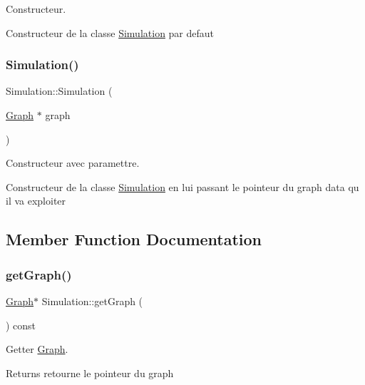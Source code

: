 Constructeur. 

Constructeur de la classe \mbox{\hyperlink{class_simulation}{Simulation}} par defaut \mbox{\label{class_simulation_acac8de557d6db1b0c1ea78b8043b5271}} 
\subsubsection{\texorpdfstring{Simulation()}{Simulation()}\hspace{0.1cm}{\footnotesize\ttfamily [2/2]}}
{\footnotesize\ttfamily Simulation\+::\+Simulation (\begin{DoxyParamCaption}\item[{\mbox{\hyperlink{class_graph}{Graph}} $\ast$}]{graph }\end{DoxyParamCaption})}



Constructeur avec paramettre. 

Constructeur de la classe \mbox{\hyperlink{class_simulation}{Simulation}} en lui passant le pointeur du graph data qu il va exploiter 

\subsection{Member Function Documentation}
\mbox{\label{class_simulation_a54d69f514110813e7ede41b6c8c9c707}} 
\subsubsection{\texorpdfstring{get\+Graph()}{getGraph()}}
{\footnotesize\ttfamily \mbox{\hyperlink{class_graph}{Graph}}$\ast$ Simulation\+::get\+Graph (\begin{DoxyParamCaption}{ }\end{DoxyParamCaption}) const}



Getter \mbox{\hyperlink{class_graph}{Graph}}. 

\begin{DoxyReturn}{Returns}
retourne le pointeur du graph 
\end{DoxyReturn}
\mbox{\label{class_simulation_a21dc3e8afd771b9bfa58f88fdce1c998}} 
